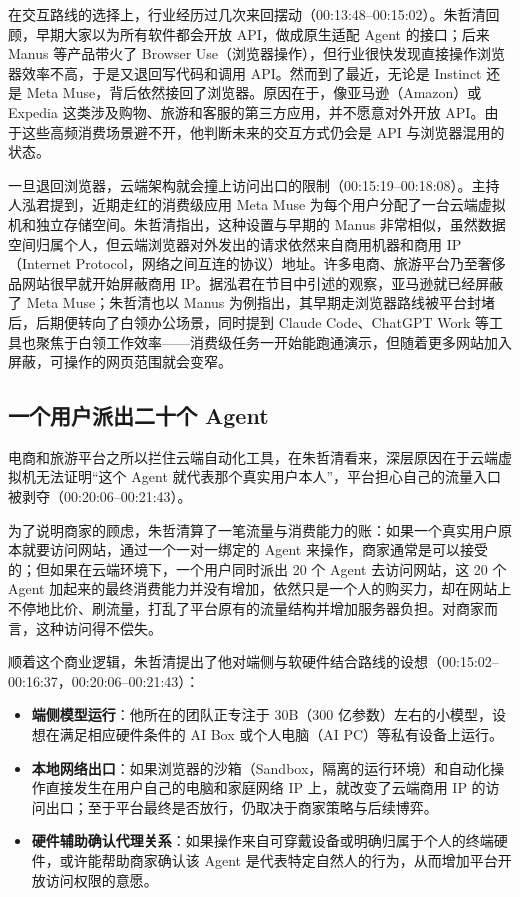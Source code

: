 \documentclass[UTF8,a4paper,11pt,fontset=fandol]{ctexart}
\begin{document}
在交互路线的选择上，行业经历过几次来回摆动（00:13:48–00:15:02）。朱哲清回顾，早期大家以为所有软件都会开放 API，做成原生适配 Agent 的接口；后来 Manus 等产品带火了 Browser Use（浏览器操作），但行业很快发现直接操作浏览器效率不高，于是又退回写代码和调用 API。然而到了最近，无论是 Instinct 还是 Meta Muse，背后依然接回了浏览器。原因在于，像亚马逊（Amazon）或 Expedia 这类涉及购物、旅游和客服的第三方应用，并不愿意对外开放 API。由于这些高频消费场景避不开，他判断未来的交互方式仍会是 API 与浏览器混用的状态。

一旦退回浏览器，云端架构就会撞上访问出口的限制（00:15:19–00:18:08）。主持人泓君提到，近期走红的消费级应用 Meta Muse 为每个用户分配了一台云端虚拟机和独立存储空间。朱哲清指出，这种设置与早期的 Manus 非常相似，虽然数据空间归属个人，但云端浏览器对外发出的请求依然来自商用机器和商用 IP（Internet Protocol，网络之间互连的协议）地址。许多电商、旅游平台乃至奢侈品网站很早就开始屏蔽商用 IP。据泓君在节目中引述的观察，亚马逊就已经屏蔽了 Meta Muse；朱哲清也以 Manus 为例指出，其早期走浏览器路线被平台封堵后，后期便转向了白领办公场景，同时提到 Claude Code、ChatGPT Work 等工具也聚焦于白领工作效率——消费级任务一开始能跑通演示，但随着更多网站加入屏蔽，可操作的网页范围就会变窄。

\subsection{一个用户派出二十个 Agent}
电商和旅游平台之所以拦住云端自动化工具，在朱哲清看来，深层原因在于云端虚拟机无法证明“这个 Agent 就代表那个真实用户本人”，平台担心自己的流量入口被剥夺（00:20:06–00:21:43）。

为了说明商家的顾虑，朱哲清算了一笔流量与消费能力的账：如果一个真实用户原本就要访问网站，通过一个一对一绑定的 Agent 来操作，商家通常是可以接受的；但如果在云端环境下，一个用户同时派出 20 个 Agent 去访问网站，这 20 个 Agent 加起来的最终消费能力并没有增加，依然只是一个人的购买力，却在网站上不停地比价、刷流量，打乱了平台原有的流量结构并增加服务器负担。对商家而言，这种访问得不偿失。

顺着这个商业逻辑，朱哲清提出了他对端侧与软硬件结合路线的设想（00:15:02–00:16:37，00:20:06–00:21:43）：
\begin{itemize}
\item \textbf{端侧模型运行}：他所在的团队正专注于 30B（300 亿参数）左右的小模型，设想在满足相应硬件条件的 AI Box 或个人电脑（AI PC）等私有设备上运行。
\item \textbf{本地网络出口}：如果浏览器的沙箱（Sandbox，隔离的运行环境）和自动化操作直接发生在用户自己的电脑和家庭网络 IP 上，就改变了云端商用 IP 的访问出口；至于平台最终是否放行，仍取决于商家策略与后续博弈。
\item \textbf{硬件辅助确认代理关系}：如果操作来自可穿戴设备或明确归属于个人的终端硬件，或许能帮助商家确认该 Agent 是代表特定自然人的行为，从而增加平台开放访问权限的意愿。
\end{itemize}
\end{document}
